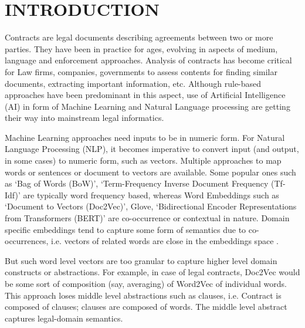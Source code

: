 \documentclass[9pt,academicons]{article}
\begin{document}
%




\section{INTRODUCTION}

Contracts are legal documents describing agreements between two or more parties. They have been in practice for ages, evolving in aspects of medium, language and enforcement approaches. Analysis of contracts has become critical for Law firms, companies, governments to assess contents for finding similar documents, extracting important information, etc. Although rule-based approaches have been predominant in this aspect, use of Artificial Intelligence (AI) in form of Machine Learning and Natural Language processing are getting their way into mainstream legal informatics.

Machine Learning approaches need inputs to be in numeric form. For Natural Language Processing (NLP), it becomes imperative to convert input (and output, in some cases) to numeric form, such as vectors. Multiple approaches to map words or sentences or document to vectors are available. Some popular ones such as `Bag of Words (BoW)', `Term-Frequency Inverse Document Frequency (Tf-Idf)' are typically word frequency based, whereas Word Embeddings such as `Document to Vectors (Doc2Vec)', Glove, `Bidirectional Encoder Representations from Transformers (BERT)' are co-occurrence or contextual in nature. Domain specific embeddings tend to capture some form of semantics due to co-occurrences, i.e. vectors of related words are close in the embeddings space \cite{Doc2VecSurvey}.

But such word level vectors are too granular to capture higher level domain constructs or abstractions. For example, in case of legal contracts, Doc2Vec would be some sort of composition (say, averaging) of Word2Vec of individual words. This approach loses middle level abstractions such as clauses, i.e. Contract is composed of clauses; clauses are composed of words. The middle level abstract captures legal-domain semantics.
\end{document}
